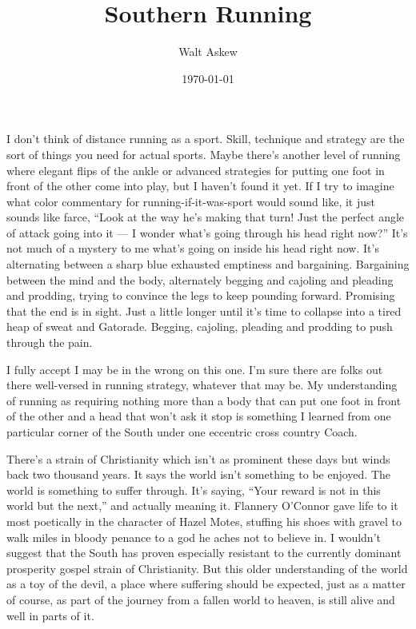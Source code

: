 \documentclass[14pt, oneside]{memoir}
\title{Southern Running}
\author{Walt Askew}
\date{\today}
\begin{document}
\maketitle

I don't think of distance running as a sport.
Skill, technique and strategy are the sort of things you need for
actual sports.
Maybe there's another level of running where elegant flips of the
ankle or advanced strategies for putting one foot in front of the
other come into play, but I haven't found it yet.
If I try to imagine what color commentary for running-if-it-was-sport
would sound like, it just sounds like farce,
``Look at the way he's making that turn! Just the perfect angle of
attack going into it --- I wonder what's going through his head right
now?''
It's not much of a mystery to me what's going on inside his head right
now. 
It's alternating between a sharp blue exhausted emptiness and
bargaining.
Bargaining between the mind and the body, alternately begging and
cajoling and pleading and prodding, trying to convince the legs to
keep pounding forward.
Promising that the end is in sight.
Just a little longer until it's time to collapse into a tired heap of
sweat and Gatorade. 
Begging, cajoling, pleading and prodding to push through the pain.

I fully accept I may be in the wrong on this one.
I'm sure there are folks out there well-versed in running strategy,
whatever that may be.
My understanding of running as requiring nothing more than a body that
can put one foot in front of the other and a head that won't ask it
stop is something I learned from one particular corner of the South
under one eccentric cross country Coach.

There's a strain of Christianity which isn't as prominent these days
but winds back two thousand years.
It says the world isn't something to be enjoyed.
The world is something to suffer through.
It's saying, ``Your reward is not in this world but the next,'' and
actually meaning it.
Flannery O'Connor gave life to it most poetically in the character of
Hazel Motes, stuffing his shoes with gravel to walk miles in bloody
penance to a god he aches not to believe in.
I wouldn't suggest that the South has proven especially resistant to the
currently dominant prosperity gospel strain of Christianity.
But this older understanding of the world as a toy of the devil, a
place where suffering should be expected, just as a matter of course,
as part of the journey from a fallen world to heaven, is still alive
and well in parts of it.
\end{document}
